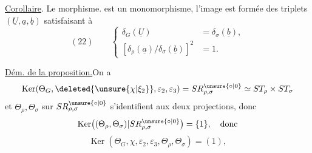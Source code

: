 \uline{Corollaire}. Le morphisme.
est un monomorphisme, l'image est formée des triplets
$(\underline U,\underline a,\underline b)$ satisfaisant à
\[
(22)\qquad\left\{\begin{aligned}
\delta_G(\underline U)&=\delta_\sigma(\underline b),\\
[\delta_\rho(\underline a)/\delta_\sigma(\underline b)]^2&=1.
\end{aligned}\right.
\]

\uline{Dém. de la proposition.}\quad On a
\[
\operatorname{Ker}(\Theta_G,\deleted{\unsure{\chi|\xi_2}},\varepsilon_2,\varepsilon_3)
=SR_{\rho,\sigma}^{\unsure{\circ|0}}\simeq ST_\rho\times ST_\sigma
\]
et $\Theta_\rho,\Theta_\sigma$ 
sur $SR_{\rho,\sigma}^{\unsure{\circ|0}}$ s'identifient aux deux projections,
donc \deleted{$\unsure{\Theta}$}
\[
\operatorname{Ker}\bigl((\Theta_\rho,\Theta_\sigma)|SR_{\rho,\sigma}^{\unsure{\circ|0}}\bigr)
=\{1\},\quad\text{donc}
\]
\[
\operatorname{Ker}(\Theta_G,\chi,\varepsilon_2,\varepsilon_3,\Theta_\rho,\Theta_\sigma)
=(1),
\]




